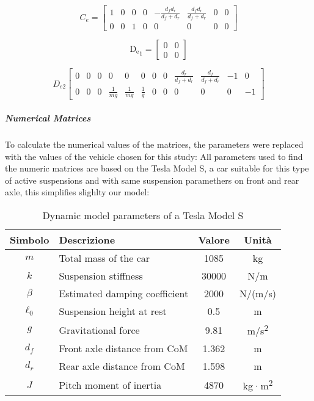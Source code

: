 \documentclass[]{report}
\begin{document}
\begin{equation}
	C_e =
	\begin{bmatrix}
		1 & 0 & 0 & 0 & -\frac{d_f d_r}{d_f + d_r} & \frac{d_f d_r}{d_f + d_r} & 0 & 0 \\
		0 & 0 & 1 & 0 & 0 & 0 & 0 & 0
	\end{bmatrix}
\end{equation}


	
	\begin{equation}
		\mathrm{D_e}_1 =
		\begin{bmatrix}
			0 & 0 \\
			0 & 0
		\end{bmatrix}
	\end{equation}
	


\begin{equation}
	D_{e2}
	\left[ 
	\begin{array}{cccccccccccc}
		0 & 0 & 0 & 0 & 0 & 0 & 0 & 0 & \frac{d_r}{d_f+d_r} & \frac{d_f}{d_f+d_r} & -1 & 0 \\
		0 & 0 & 0 & \frac{1}{mg} & \frac{1}{mg} & \frac{1}{g} & 0 & 0 & 0 & 0 & 0 & -1
	\end{array}\right] 
\end{equation}
	\vspace{0.5cm}
	\subparagraph{Numerical Matrices}
	To calculate the numerical values of the matrices, the parameters were replaced with the values of the vehicle chosen for this study: All parameters used to find the numeric matrices are based on the Tesla Model S, a car suitable for this type of active suspensions and with same suspension paramethers on front and rear axle, this simplifies slighlty our model:\\
	
	\vspace{1cm}
	\begin{table}[h!]
		\centering
		\begin{tabular}{|c|l|c|c|}
			\hline
			\textbf{Simbolo} & \textbf{Descrizione} & \textbf{Valore} & \textbf{Unità} \\
			\hline
			$m$     & Total mass of the car             & 1085   & kg \\
			$k$     & Suspension stiffness              & 30000  & N/m \\
			$\beta$ & Estimated damping coefficient   & 2000   & N/(m/s) \\
			$\ell_0$ & Suspension height at rest     & 0.5    & m \\
			$g$     & Gravitational force          & 9.81   & m/s\textsuperscript{2} \\
			$d_f$   & Front axle distance from CoM & 1.362  & m \\
			$d_r$   & Rear axle distance from CoM & 1.598 & m \\
			$J$     & Pitch moment of inertia         & 4870   & kg·m\textsuperscript{2} \\
			\hline
		\end{tabular}
		\caption{Dynamic model parameters of a Tesla Model S}
		\label{tab:parametri_tesla}
	\end{table}
\end{document}
